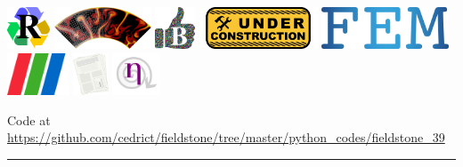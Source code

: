 
\noindent
\includegraphics[height=1.25cm]{images/pictograms/replication}
\includegraphics[height=1.25cm]{images/pictograms/aspect_logo}
\includegraphics[height=1.25cm]{images/pictograms/benchmark}
\includegraphics[height=1.25cm]{images/pictograms/under_construction}
\includegraphics[height=1.25cm]{images/pictograms/FEM}
\includegraphics[height=1.25cm]{images/pictograms/paraview}
\includegraphics[height=1.25cm]{images/pictograms/publication}
\includegraphics[height=1.25cm]{images/pictograms/nonlinear}



\begin{center}
Code at \url{https://github.com/cedrict/fieldstone/tree/master/python_codes/fieldstone_39}
\end{center}

\par\noindent\rule{\textwidth}{0.4pt}


